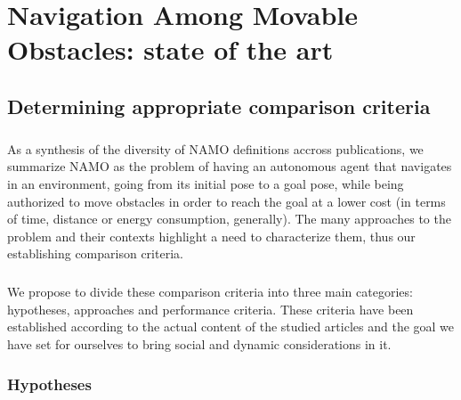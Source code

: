 
\chapter{Navigation Among Movable Obstacles: state of the art} %

\label{Chapter2} %

\section{Determining appropriate comparison criteria}

\paragraph{} As a synthesis of the diversity of NAMO definitions accross publications, we summarize NAMO as the problem of having an autonomous agent that navigates in an environment, going from its initial pose to a goal pose, while being authorized to move obstacles in order to reach the goal at a lower cost (in terms of time, distance or energy consumption, generally). The many approaches to the problem and their contexts highlight a need to characterize them, thus our establishing comparison criteria.

\paragraph{} We propose to divide these comparison criteria into three main categories: hypotheses, approaches and performance criteria. These criteria have been established according to the actual content of the studied articles and the goal we have set for ourselves to bring social and dynamic considerations in it.

\subsection{Hypotheses}

